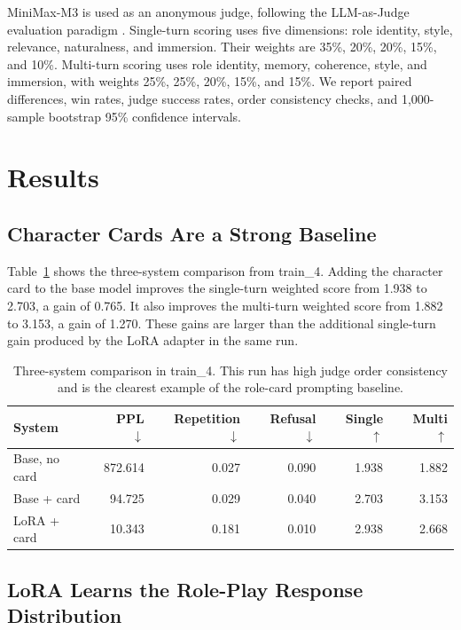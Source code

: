 \documentclass{article}
\newcommand{\base}{Base, no card\xspace}
\newcommand{\card}{Base + card\xspace}
\newcommand{\lora}{LoRA + card\xspace}
\begin{document}
MiniMax-M3 is used as an anonymous judge, following the LLM-as-Judge evaluation
paradigm \citep{zheng2023judging}. Single-turn scoring uses five dimensions:
role identity, style, relevance, naturalness, and immersion. Their weights are
35\%, 20\%, 20\%, 15\%, and 10\%. Multi-turn scoring uses role identity,
memory, coherence, style, and immersion, with weights 25\%, 25\%, 20\%, 15\%,
and 15\%. We report paired differences, win rates, judge success rates, order
consistency checks, and 1,000-sample bootstrap 95\% confidence intervals.

\section{Results}

\subsection{Character Cards Are a Strong Baseline}

Table~\ref{tab:train4-systems} shows the three-system comparison from
train\_4. Adding the character card to the base model improves the single-turn
weighted score from 1.938 to 2.703, a gain of 0.765. It also improves the
multi-turn weighted score from 1.882 to 3.153, a gain of 1.270. These gains are
larger than the additional single-turn gain produced by the LoRA adapter in the
same run.

\begin{table}[t]
  \centering
  \caption{Three-system comparison in train\_4. This run has high judge order
  consistency and is the clearest example of the role-card prompting baseline.}
  \label{tab:train4-systems}
  \small
  \begin{tabular}{lrrrrr}
    \toprule
    System & PPL $\downarrow$ & Repetition $\downarrow$ & Refusal $\downarrow$ &
    Single $\uparrow$ & Multi $\uparrow$ \\
    \midrule
    \base & 872.614 & 0.027 & 0.090 & 1.938 & 1.882 \\
    \card & 94.725 & 0.029 & 0.040 & 2.703 & 3.153 \\
    \lora & 10.343 & 0.181 & 0.010 & 2.938 & 2.668 \\
    \bottomrule
  \end{tabular}
\end{table}

\subsection{LoRA Learns the Role-Play Response Distribution}
\end{document}
